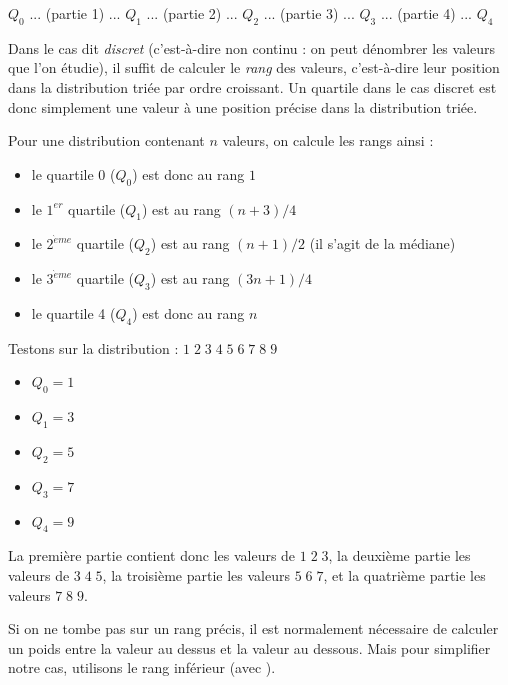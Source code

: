 \documentclass[11pt,a4paper]{article}
\begin{document}
\begin{center}
$ Q_{0} $ ... (partie 1) ... $ Q_{1} $ ... (partie 2) ... $ Q_{2} $ ... (partie 3) ... $ Q_{3} $ ... (partie 4) ... $ Q_{4} $
\end{center}

Dans le cas dit \textit{discret} (c'est-à-dire non continu : on peut dénombrer les valeurs que l'on étudie), il suffit de calculer le \textit{rang} des valeurs, c'est-à-dire leur position dans la distribution triée par ordre croissant.
Un quartile dans le cas discret est donc simplement une valeur à une position précise dans la distribution triée.

\bigskip

Pour une distribution contenant $ n $ valeurs, on calcule les rangs ainsi :

\begin{itemize}
\item le quartile 0 ($Q_{0}$) est donc au rang $ 1 $
\item le $ 1^{er} $ quartile ($Q_{1}$) est au rang $ (n + 3) / 4 $
\item le $ 2^{\grave{e}me} $ quartile ($Q_{2}$) est au rang $ (n + 1) / 2 $ (il s'agit de la médiane)
\item le $ 3^{\grave{e}me} $ quartile ($Q_{3}$) est au rang $ (3n + 1) / 4 $
\item le quartile 4 ($Q_{4}$) est donc au rang $ n $
\end{itemize}

\bigskip

Testons sur la distribution : $ 1 \; 2 \; 3 \; 4 \; 5 \; 6 \; 7 \; 8 \; 9 $

\begin{itemize}
\item $ Q_{0} = 1 $
\item $ Q_{1} = 3 $
\item $ Q_{2} = 5 $
\item $ Q_{3} = 7 $
\item $ Q_{4} = 9 $
\end{itemize}

\bigskip

La première partie contient donc les valeurs de $ 1 \; 2 \; 3 $, la deuxième partie les valeurs de $ 3 \; 4 \; 5 $, la troisième partie les valeurs $ 5 \; 6 \; 7 $, et la quatrième partie les valeurs $ 7 \; 8 \; 9 $.

\smallskip

Si on ne tombe pas sur un rang précis, il est normalement nécessaire de calculer un poids entre la valeur au dessus et la valeur au dessous.
Mais pour simplifier notre cas, utilisons le rang inférieur (avec ).
\end{document}
